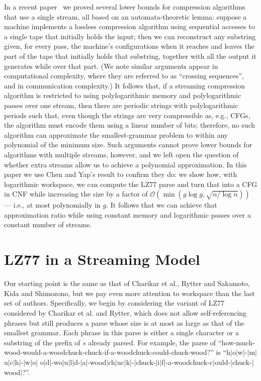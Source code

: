 \documentclass[runningheads]{llncs}
\newcommand{\Oh}[1]
    {\ensuremath{\mathcal{O}\!\left( {#1} \right)}}
\begin{document}
In a recent paper~\cite{Gag09} we proved several lower bounds for compression algorithms that use a single stream, all based on an automata-theoretic lemma: suppose a machine implements a lossless compression algorithm using sequential accesses to a single tape that initially holds the input; then we can reconstruct any substring given, for every pass, the machine's configurations when it reaches and leaves the part of the tape that initially holds that substring, together with all the output it generates while over that part.  (We note similar arguments appear in computational complexity, where they are referred to as ``crossing sequences'', and in communication complexity.)  It follows that, if a streaming compression algorithm is restricted to using polylogarithmic memory and polylogarithmic passes over one stream, then there are periodic strings with polylogarithmic periods such that, even though the strings are very compressible as, e.g., CFGs, the algorithm must encode them using a linear number of bits; therefore, no such algorithm can approximate the smallest-grammar problem to within any polynomial of the minimum size.  Such arguments cannot prove lower bounds for algorithms with multiple streams, however, and we left open the question of whether extra streams allow us to achieve a polynomial approximation.  In this paper we use Chen and Yap's result to confirm they do: we show how, with logarithmic workspace, we can compute the LZ77 parse and turn that into a CFG in CNF while increasing the size by a factor of $\Oh{\min \left( g \log g, \sqrt{n / \log n} \right)}$ --- i.e., at most polynomially in $g$.  It follows that we can achieve that approximation ratio while using constant memory and logarithmic passes over a constant number of streams.

\section{LZ77 in a Streaming Model} \label{sec:LZ77}

Our starting point is the same as that of Charikar et al., Rytter and Sakamoto, Kida and Shimozono, but we pay even more attention to workspace than the last set of authors.  Specifically, we begin by considering the variant of LZ77 considered by Charikar et al. and Rytter, which does not allow self-referencing phrases but still produces a parse whose size is at most as large as that of the smallest grammar.  Each phrase in this parse is either a single character or a substring of the prefix of $s$ already parsed.  For example, the parse of ``{\sf how-much-wood-would-a-woodchuck-chuck-if-a-woodchuck-could-chuck-wood?}'' is ``{\sf h$|$o$|$w$|$-$|$m$|$u$|$c$|$h$|$-$|$w$|$o$|$
\linebreak
o$|$d$|$-wo$|$u$|$l$|$d-$|$a$|$-wood$|$ch$|$uc$|$k$|$-$|$chuck-$|$i$|$f$|$-a-woodchuck-c$|$ould-$|$chuck-$|$wood$|$?}''.
\end{document}
